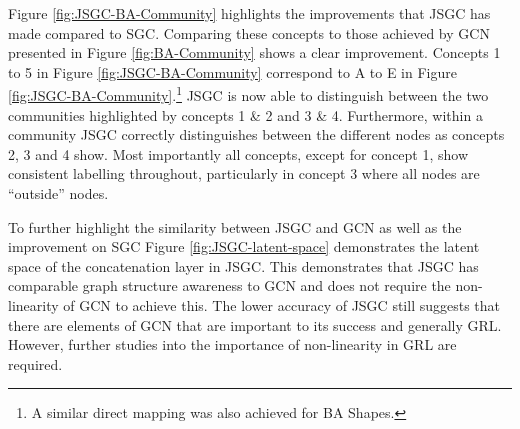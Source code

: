 

Figure \ref{fig:JSGC-BA-Community} highlights the improvements that JSGC has made compared to SGC.
Comparing these concepts to those achieved by GCN presented in Figure \ref{fig:BA-Community} shows a clear improvement.
Concepts 1 to 5 in Figure \ref{fig:JSGC-BA-Community} correspond to A to E in Figure \ref{fig:JSGC-BA-Community}.\footnote{A similar direct mapping was also achieved for BA Shapes.}
JSGC is now able to distinguish between the two communities highlighted by concepts 1 \& 2 and 3 \& 4.
Furthermore, within a community JSGC correctly distinguishes between the different nodes as concepts 2, 3 and 4 show.
Most importantly all concepts, except for concept 1, show consistent labelling throughout, particularly in concept 3 where all nodes are ``outside'' nodes.

To further highlight the similarity between JSGC and GCN as well as the improvement on SGC Figure \ref{fig:JSGC-latent-space} demonstrates the latent space of the concatenation layer in JSGC.
This demonstrates that JSGC has comparable graph structure awareness to GCN and does not require the non-linearity of GCN to achieve this.
The lower accuracy of JSGC still suggests that there are elements of GCN that are important to its success and generally GRL.
However, further studies into the importance of non-linearity in GRL are required.
